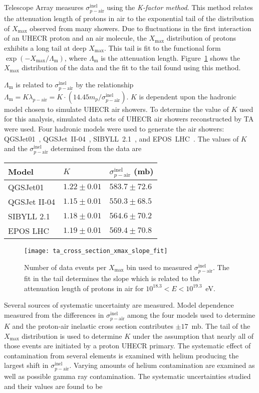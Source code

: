 \documentclass[12pt]{article}
\newcommand{\xm}{$X_{\mathrm{max}}$}
\newcommand{\spairinel}{$\sigma_{p-\mathrm{air}}^{\mathrm{inel}}$}
\begin{document}
Telescope Array measures \spairinel{} using the \textit{K-factor
  method}. This method relates the attenuation length of protons in
air to the exponential tail of the distribution of \xm{} observed from
many showers. Due to fluctuations in the first interaction of an UHECR
proton and an air molecule, the \xm{} distribution of protons exhibits
a long tail at deep \xm. This tail is fit to the functional form
$\exp(-X_{\mathrm{max}}/\Lambda_{\mathrm{m}})$, where
$\Lambda_{\mathrm{m}}$ is the attenuation
length. Figure~\ref{fig:xmax_slope} shows the \xm{} distribution of
the data and the fit to the tail found using this method.

$\Lambda_{\mathrm{m}}$ is related to \spairinel{} by the
relationship $\Lambda_{\mathrm{m}} = K\lambda_{p-\mathrm{air}} =
K\cdot(14.45m_{p}/\sigma_{p-\mathrm{air}}^{\mathrm{inel}})$. $K$ is
dependent upon the hadronic model chosen to simulate UHECR air
showers. To determine the value of $K$ used for this analysis,
simulated data sets of UHECR air showers reconstructed by TA were
used. Four hadronic models were used to generate the air showers:
QGSJet01~\cite{Kalmykov:1997te},
QGSJet~II-04~\cite{Ostapchenko:2010vb},
SIBYLL~2.1~\cite{Ahn:2009wx}, and EPOS~LHC~\cite{Pierog:2013ria}. The
values of $K$ and the \spairinel{} determined from the data are
\medskip
\begin{center}
      \begin{tabular}{l l l}
          Model         &$K$               &\spairinel{} (mb) \\
          \hline
          QGSJet01      &$1.22 \pm 0.01$   &$583.7 \pm 72.6$ \\
          QGSJet II-04  &$1.15 \pm 0.01$   &$550.3 \pm 68.5$ \\
          SIBYLL 2.1    &$1.18 \pm 0.01$   &$564.6 \pm 70.2$ \\
          EPOS LHC      &$1.19 \pm 0.01$   &$569.4 \pm 70.8$
      \end{tabular}
\end{center}
\medskip

\begin{figure}
  \centering
  \texttt{[image: ta\_cross\_section\_xmax\_slope\_fit]}
  \caption{Number of data events per \xm{} bin used to measured
    \spairinel{}. The fit in the tail determines the slope which is
    related to the attenuation length of protons in air for $10^{18.3}
    < E < 10^{19.3}$~eV.}
  \label{fig:xmax_slope}
\end{figure}

Several sources of systematic uncertainty are measured. Model
dependence measured from the differences in \spairinel{} among the
four models used to determine $K$ and the proton-air inelastic cross
section contributes $\pm 17$~mb. The tail of the \xm{} distribution is
used to determine $K$ under the assumption that nearly all of those
events are initiated by a proton UHECR primary. The systematic effect
of contamination from several elements is examined with helium
producing the largest shift in \spairinel. Varying amounts of helium
contamination are examined as well as possible gamma ray
contamination. The systematic uncertainties studied and their values
are found to be
\end{document}
